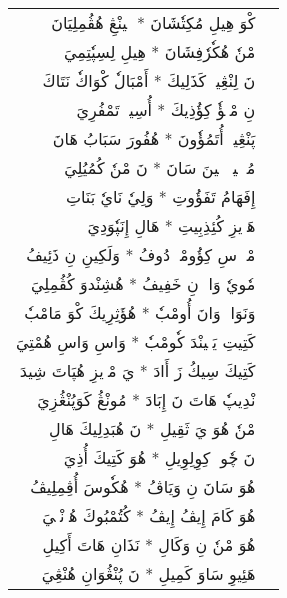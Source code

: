 \documentclass[a4paper, 12pt]{report}
\begin{document}
\begin{longtable}{rl}
\textarabic{كْوَ هِيلِ مُكِتٗشَانَ  *  مٖينْڠِ هُڤُمِلِيَانَ} & \\ 
\textarabic{مْنٗ هُكٗرٗفِشَانَ  *  هِيلِ لِسِپٗتِمِيَ} & \\ 
[8mm] 

\textarabic{نَ لِنْڠِينٖ كَذَلِيكَ  *  أَمْبَالٗ كْوَاكٗ نَتَاكَ} & \\ 
\textarabic{نِ مْكٖؤٗ كِؤُذِيكَ  *  أُسِيوٖ تَمْفُرِيَ} & \\ 
[8mm] 

\textarabic{پَنْڠِينٖ أُتَمُؤٗونَ  *  هُفُورَ سَبَابُ هَانَ} & \\ 
\textarabic{مُئٖلٖيوٖ تٖينَ سَانَ  *  نَ مْنٗ كُمُيُلِيَ} & \\ 
[8mm] 

\textarabic{إِفَهَامُ تَفَؤُوتِ  *  وَلِيٗ نَايٗ بَنَاتِ} & \\ 
\textarabic{هَوٖيزِ كُئِذِبِيتِ  *  هَالِ إِنَپٗوَدِيَ} & \\ 
[8mm] 

\textarabic{مْكٖ سِ كِؤُومْبٖ دُوفُ  *  وَلَكِينِ نِ ذَئِيفُ} & \\ 
\textarabic{مٗويٗ وَاكٖ نِ خَفِيفُ  *  هُشِنْدوَ كُڤُمِلِيَ} & \\ 
[8mm] 

\textarabic{وَنَوَاكٖ وَانَ أُومْبٗ  *  هُؤَثِرِيكَ كْوَ مَامْبٗ} & \\ 
\textarabic{كَتِيتِ يَكٖينْدَ كٗومْبٗ  *  وَاسِ وَاسِ هُمْتِيَ} & \\ 
[8mm] 

\textarabic{كَتِيكَ سِيكُ زَ أَادَ  *  يَ مْوٖيزِ هُپَاتَ شِيدَ} & \\ 
\textarabic{نْدِيپٗ هَاتَ نَ إِبَادَ  *  مُونْڠُ كَوَپُنْڠُزِيَ} & \\ 
[8mm] 

\textarabic{مْنٗ هُوَ يَ ثَقِيلِ  *  نَ هُبَدِلِيكَ هَالِ} & \\ 
\textarabic{نَ چٗوتٖ كِوِلِوِيلِ  *  هُوَ كَتِيكَ أُذِيَ} & \\ 
[8mm] 

\textarabic{هُوَ سَانَ نِ وَيَاڤُ  *  هُكٗوسَ أُڤِمِلِيڤُ} & \\ 
\textarabic{هُوَ كَامَ إِيڤُ إِيڤُ  *  كُتُمْبُوكَ هُزٖنْڠٖيَ} & \\ 
[8mm] 

\textarabic{هُوَ مْنٗ نِ وَكَالِ  *  نَذَانِ هَاتَ أَكِيلِ} & \\ 
\textarabic{هَئِيوِ سَاوَ كَمِيلِ  *  نَ پُنْڠُوَانِ هُنْڠِيَ} & \\ 
[8mm] 


\end{longtable}
\end{document}
